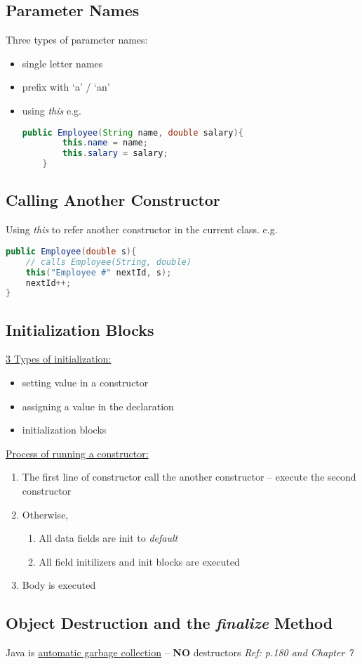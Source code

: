 \documentclass[12pt]{article}
\begin{document}
\subsection{Parameter Names}
Three types of parameter names:
\begin{itemize}
    \item single letter names
    \item prefix with `a' / `an'
    \item using \textit{this}\newline
    e.g.
    \begin{lstlisting}[language=Java]
    public Employee(String name, double salary){
        this.name = name;
        this.salary = salary;
    }
    \end{lstlisting}
\end{itemize}

\subsection{Calling Another Constructor}
Using \textit{this} to refer another constructor in the current class.\newline
e.g.
\begin{lstlisting}[language=Java]
public Employee(double s){
    // calls Employee(String, double)
    this("Employee #" nextId, s);
    nextId++;
}
\end{lstlisting}

\subsection{Initialization Blocks}
\underline{3 Types of initialization:}
\begin{itemize}
    \item setting value in a constructor
    \item assigning a value in the declaration
    \item initialization blocks
\end{itemize}

\underline{Process of running a constructor:}
\begin{enumerate}
    \item The first line of constructor call the another constructor -- execute the second constructor
    \item Otherwise,
    \begin{enumerate}
        \item All data fields are init to \emph{default}
        \item All field initilizers and init blocks are executed
    \end{enumerate} 
    \item Body is executed
\end{enumerate}

\subsection{Object Destruction and the \emph{finalize} Method}
Java is \underline{automatic garbage collection} -- \textbf{NO} destructors\newline
\textit{Ref: p.180 and Chapter 7}
\end{document}
